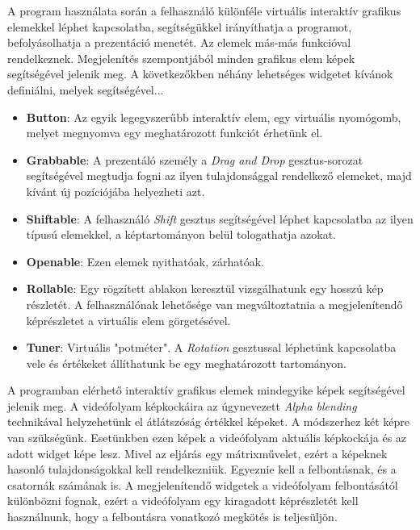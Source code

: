 

A program használata során a felhasználó különféle virtuális interaktív grafikus elemekkel léphet kapcsolatba, segítségükkel irányíthatja a programot, befolyásolhatja a prezentáció menetét. Az elemek más-más funkcióval rendelkeznek. Megjelenítés szempontjából minden grafikus elem képek segítségével jelenik meg. A következőkben néhány lehetséges widgetet kívánok definiálni, melyek segítségével...
\begin{itemize}
	\item \textbf{Button}: Az egyik legegyszerűbb interaktív elem, egy virtuális nyomógomb, melyet megnyomva egy meghatározott funkciót érhetünk el.
	\item \textbf{Grabbable}: A prezentáló személy a \textit{Drag and Drop} gesztus-sorozat segítségével megtudja fogni az ilyen tulajdonsággal rendelkező elemeket, majd kívánt új pozíciójába helyezheti azt.
	\item \textbf{Shiftable}: A felhasználó \textit{Shift} gesztus segítségével léphet kapcsolatba az ilyen típusú elemekkel, a képtartományon belül tologathatja azokat.
	\item \textbf{Openable}: Ezen elemek nyithatóak, zárhatóak.
	\item \textbf{Rollable}: Egy rögzített ablakon keresztül vizsgálhatunk egy hosszú kép részletét. A felhasználónak lehetősége van megváltoztatnia a megjelenítendő képrészletet a virtuális elem görgetésével.
	\item \textbf{Tuner}: Virtuális "potméter". A \textit{Rotation} gesztussal léphetünk kapcsolatba vele és értékeket állíthatunk be egy meghatározott tartományon.
\end{itemize}


A programban elérhető interaktív grafikus elemek mindegyike képek segítségével jelenik meg. A videófolyam képkockáira az úgynevezett \textit{Alpha blending}\cite{salvi2014multi} technikával helyzehetünk el átlátszóság értékkel képeket. A módszerhez két képre van szükségünk. Esetünkben ezen képek a videófolyam aktuális képkockája és az adott widget képe lesz. Mivel az eljárás egy mátrixművelet, ezért a képeknek hasonló tulajdonságokkal kell rendelkezniük. Egyeznie kell a felbontásnak, és a csatornák számának is. A megjelenítendő widgetek a videófolyam felbontásától különbözni fognak, ezért a videófolyam egy kiragadott képrészletét kell használnunk, hogy a felbontásra vonatkozó megkötés is teljesüljön.


